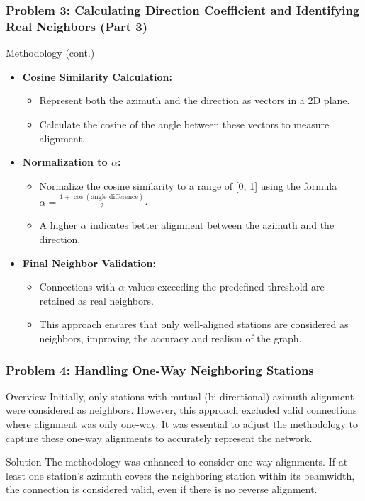 \begin{frame}
    \frametitle{Problem 3: Calculating Direction Coefficient and Identifying Real Neighbors (Part 3)}

    \begin{block}{Methodology (cont.)}
        \begin{itemize}
            \item \textbf{Cosine Similarity Calculation:}
            \begin{itemize}
                \item Represent both the azimuth and the direction as vectors in a 2D plane.
                \item Calculate the cosine of the angle between these vectors to measure alignment.
            \end{itemize}
            \item \textbf{Normalization to \( \alpha \):}
            \begin{itemize}
                \item Normalize the cosine similarity to a range of [0, 1] using the formula \( \alpha = \frac{1 + \cos(\text{angle difference})}{2} \).
                \item A higher \( \alpha \) indicates better alignment between the azimuth and the direction.
            \end{itemize}
            \item \textbf{Final Neighbor Validation:}
            \begin{itemize}
                \item Connections with \( \alpha \) values exceeding the predefined threshold are retained as real neighbors.
                \item This approach ensures that only well-aligned stations are considered as neighbors, improving the accuracy and realism of the graph.
            \end{itemize}
        \end{itemize}
    \end{block}
\end{frame}

\begin{frame}
    \frametitle{Problem 4: Handling One-Way Neighboring Stations}

    \begin{block}{Overview}
        Initially, only stations with mutual (bi-directional) azimuth alignment were considered as neighbors. However, this approach excluded valid connections where alignment was only one-way. It was essential to adjust the methodology to capture these one-way alignments to accurately represent the network.
    \end{block}

    \begin{block}{Solution}
        The methodology was enhanced to consider one-way alignments. If at least one station's azimuth covers the neighboring station within its beamwidth, the connection is considered valid, even if there is no reverse alignment.
    \end{block}
\end{frame}

